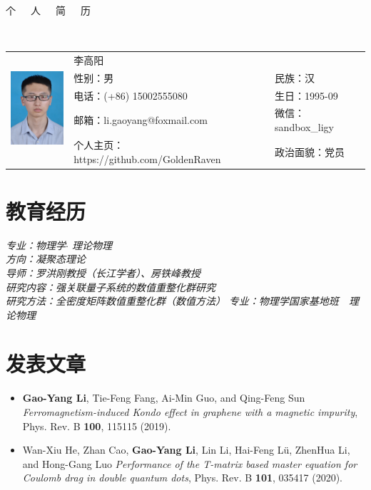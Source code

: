 \documentclass{resume}
\begin{document}

\begin{center}
\Huge{个~~~人~~~简~~~历}
\end{center}
\\
\Large{
  \begin{tabu}{ c l l }
    &
   \scshape{李高阳} &  \\
    & 性别：男 & 民族：汉 \\
    & 电话：(+86) 15002555080 & 生日：1995-09 \\
    & 邮箱：li.gaoyang@foxmail.com & 微信：sandbox\_ligy\\
    & 个人主页：https://github.com/GoldenRaven & 政治面貌：党员
  \end{tabu}
}

\section{教育经历}
\textit{专业：物理学$\cdot$ 理论物理}\\
\textit{方向：凝聚态理论}\\
\textit{导师：罗洪刚教授（长江学者）、房铁峰教授}\\
\textit{研究内容：强关联量子系统的数值重整化群研究}\\
\textit{研究方法：全密度矩阵数值重整化群（数值方法）}
\textit{专业：物理学国家基地班\ \ 理论物理}

\section{发表文章}
\begin{itemize}
\item \textbf{Gao-Yang Li}, Tie-Feng Fang, Ai-Min Guo, and Qing-Feng Sun \textit{Ferromagnetism-induced Kondo effect in graphene with a magnetic impurity}, Phys. Rev. B \textbf{100}, 115115 (2019).
\item Wan-Xiu He, Zhan Cao, \textbf{Gao-Yang Li}, Lin Li, Hai-Feng Lü, ZhenHua Li, and Hong-Gang Luo \textit{Performance of the T-matrix based master equation for Coulomb drag in double quantum dots}, Phys. Rev. B \textbf{101}, 035417 (2020).
\end{itemize}
\end{document}
